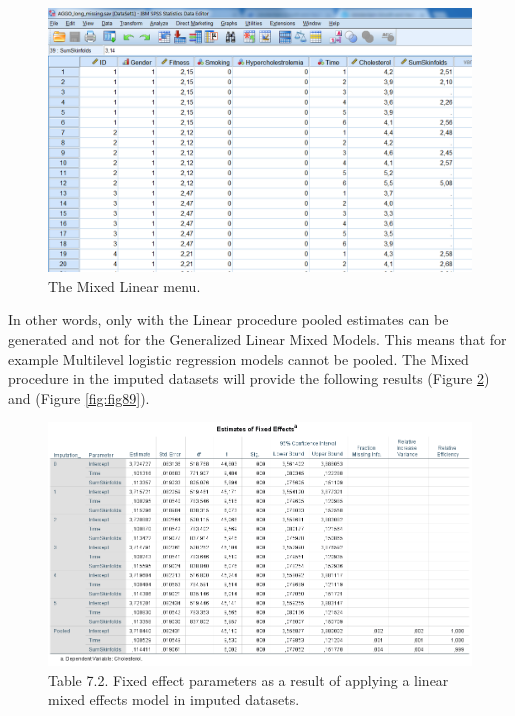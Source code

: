 \documentclass[]{book}
\theoremstyle{definition}
\theoremstyle{definition}
\theoremstyle{definition}
\theoremstyle{remark}
\begin{document}
\begin{figure}

{\centering \includegraphics[width=0.9\linewidth]{images/fig7.15} 

}

\caption{The Mixed Linear menu.}\label{fig:fig87}
\end{figure}

In other words, only with the Linear procedure pooled estimates can be
generated and not for the Generalized Linear Mixed Models. This means
that for example Multilevel logistic regression models cannot be pooled.
The Mixed procedure in the imputed datasets will provide the following
results (Figure \ref{fig:fig88}) and (Figure \ref{fig:fig89}).

\begin{figure}

{\centering \includegraphics[width=0.9\linewidth]{images/table7.2} 

}

\caption{Table 7.2. Fixed effect parameters as a result of applying a linear mixed effects model in imputed datasets.}\label{fig:fig88}
\end{figure}
\end{document}
